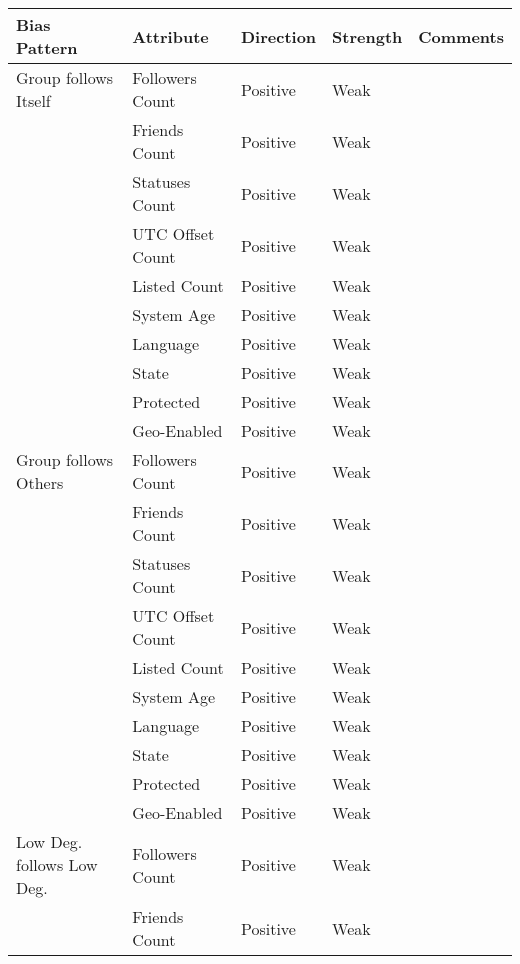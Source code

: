 
\noindent \begin{tabular}[t]{| p{1.5in} | p{1.25in} | p{1in} | p{1in} | p{1.25in} |}
\hline
\textbf{Bias Pattern} & \textbf{Attribute} & \textbf{Direction} & \textbf{Strength} & \textbf{Comments}  \\ \hline
Group follows Itself & Followers Count & Positive & Weak &  \\ \hline
                     & Friends Count & Positive & Weak &  \\ \hline
                     & Statuses Count & Positive & Weak &  \\ \hline
                     & UTC Offset Count & Positive & Weak &  \\ \hline
                     & Listed Count & Positive & Weak &  \\ \hline
                     & System Age & Positive & Weak &  \\ \hline
                     & Language  & Positive & Weak &  \\ \hline
                     & State & Positive & Weak &  \\ \hline
                     & Protected & Positive & Weak &  \\ \hline
                     & Geo-Enabled & Positive & Weak &  \\ \hline
Group follows Others & Followers Count & Positive & Weak &  \\ \hline
                     & Friends Count & Positive & Weak &  \\ \hline
                     & Statuses Count & Positive & Weak &  \\ \hline
                     & UTC Offset Count & Positive & Weak &  \\ \hline
                     & Listed Count & Positive & Weak &  \\ \hline
                     & System Age & Positive & Weak &  \\ \hline
                     & Language  & Positive & Weak &  \\ \hline
                     & State & Positive & Weak &  \\ \hline
                     & Protected & Positive & Weak &  \\ \hline
                     & Geo-Enabled & Positive & Weak &  \\ \hline
Low Deg. follows Low Deg. & Followers Count & Positive & Weak &  \\ \hline
                     & Friends Count & Positive & Weak &  \\ \hline

\end{tabular}
